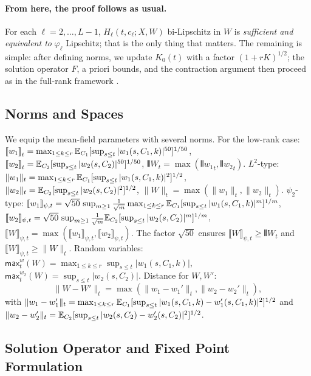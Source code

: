 \documentclass[nohyperref]{article}
\theoremstyle{plain}
\theoremstyle{definition}
\theoremstyle{remark}
\begin{document}
\paragraph*{From here, the proof follows as usual.} For each $\ell=2,\ldots,L-1$, $H_\ell(t,c_\ell;X,W)$ bi-Lipschitz in $W$ is \emph{sufficient and equivalent to} $\varphi_\ell$ Lipschitz; that is the only thing that matters. The remaining is simple: after defining norms, we update $K_0(t)$ with a factor $(1+rK)^{1/2}$; the solution operator $F$, a priori bounds, and the contraction argument then proceed as in the full-rank framework \cite{nguyen2023rigorousframeworkmeanfield}.

\subsection{Norms and Spaces}
\label{app:wellposed-norms}

We equip the mean-field parameters with several norms. For the low-rank case: ${[\![ w_1 ]\!]}_t = \max_{1\le k\le r}\mathbb{E}_{C_1}[\sup_{s\le t}|w_1(s,C_1,k)|^{50}]^{1/50}$, ${[\![ w_2 ]\!]}_t = \mathbb{E}_{C_2}[\sup_{s\le t}|w_2(s,C_2)|^{50}]^{1/50}$, ${\interleave{W}}_t = \max({\interleave{w_1}}_t, {\interleave{w_2}}_t)$. $L^2$-type: $\|w_1\|_t = \max_{1\le k\le r}\mathbb{E}_{C_1}[\sup_{s\le t}|w_1(s,C_1,k)|^2]^{1/2}$, $\|w_2\|_t = \mathbb{E}_{C_2}[\sup_{s\le t}|w_2(s,C_2)|^2]^{1/2}$, $\|W\|_t = \max(\|w_1\|_t, \|w_2\|_t)$. $\psi_2$-type: $[\![ w_1]\!]_{\psi,t} = \sqrt{50}\,\sup_{m\ge 1}\frac{1}{\sqrt{m}}\max_{1\le k\le r}\mathbb{E}_{C_1}[\sup_{s\le t}|w_1(s,C_1,k)|^m]^{1/m}$, $[\![ w_2]\!]_{\psi,t} = \sqrt{50}\,\sup_{m\ge 1}\frac{1}{\sqrt{m}}\mathbb{E}_{C_2}[\sup_{s\le t}|w_2(s,C_2)|^m]^{1/m}$, $\llbracket W\rrbracket_{\psi,t} = \max(\llbracket w_1\rrbracket_{\psi,t}, \llbracket w_2\rrbracket_{\psi,t})$. The factor $\sqrt{50}$ ensures $\llbracket W\rrbracket_{\psi,t}\ge {\interleave{W}}_t$ and $\llbracket W\rrbracket_{\psi,t}\ge \|W\|_t$. Random variables: $\mathsf{max}_t^w(W) = \max_{1\le k\le r}\sup_{s\le t}|w_1(s,C_1,k)|$, $\mathsf{max}_t^{w_2}(W) = \sup_{s\le t}|w_2(s,C_2)|$. Distance for $W,W'$:
\begin{equation}\label{eq:def-MF-distance-app}\|W-W'\|_t = \max(\|w_1-w_1'\|_t, \|w_2-w_2'\|_t),\end{equation}
with $\|w_1-w_1'\|_t = \max_{1\le k\le r}\mathbb{E}_{C_1}[\sup_{s\le t}|w_1(s,C_1,k)-w_1'(s,C_1,k)|^2]^{1/2}$ and $\|w_2-w_2'\|_t = \mathbb{E}_{C_2}[\sup_{s\le t}|w_2(s,C_2)-w_2'(s,C_2)|^2]^{1/2}$.

\subsection{Solution Operator and Fixed Point Formulation}
\end{document}
